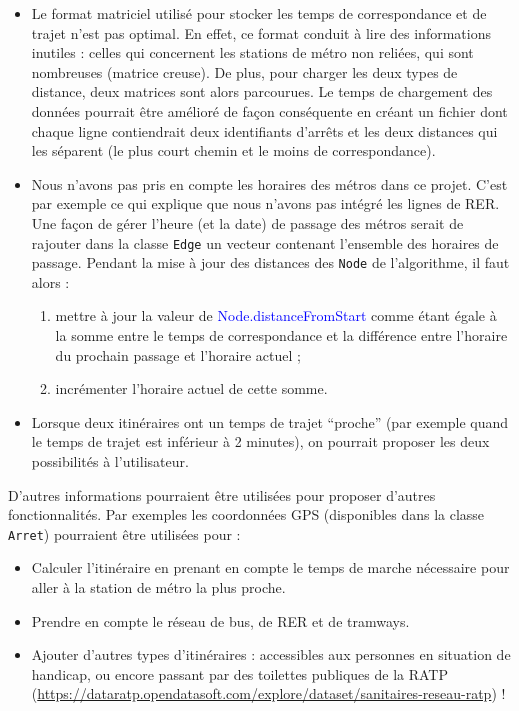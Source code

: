 \documentclass[,french]{article}
\begin{document}
\begin{itemize}
\item
  Le format matriciel utilisé pour stocker les temps de correspondance
  et de trajet n'est pas optimal. En effet, ce format conduit à lire des
  informations inutiles : celles qui concernent les stations de métro
  non reliées, qui sont nombreuses (matrice creuse). De plus, pour
  charger les deux types de distance, deux matrices sont alors
  parcourues. Le temps de chargement des données pourrait être amélioré
  de façon conséquente en créant un fichier dont chaque ligne
  contiendrait deux identifiants d'arrêts et les deux distances qui les
  séparent (le plus court chemin et le moins de correspondance).
\item
  Nous n'avons pas pris en compte les horaires des métros dans ce
  projet. C'est par exemple ce qui explique que nous n'avons pas intégré
  les lignes de RER. Une façon de gérer l'heure (et la date) de passage
  des métros serait de rajouter dans la classe \texttt{Edge} un vecteur
  contenant l'ensemble des horaires de passage. Pendant la mise à jour
  des distances des \texttt{Node} de l'algorithme, il faut alors :

  \begin{enumerate}
  \def\labelenumi{\arabic{enumi}.}
  \item
    mettre à jour la valeur de \textcolor{blue}{Node.distanceFromStart}
    comme étant égale à la somme entre le temps de correspondance et la
    différence entre l'horaire du prochain passage et l'horaire actuel ;
  \item
    incrémenter l'horaire actuel de cette somme.
  \end{enumerate}
\item
  Lorsque deux itinéraires ont un temps de trajet ``proche'' (par
  exemple quand le temps de trajet est inférieur à 2 minutes), on
  pourrait proposer les deux possibilités à l'utilisateur.
\end{itemize}

D'autres informations pourraient être utilisées pour proposer d'autres
fonctionnalités. Par exemples les coordonnées GPS (disponibles dans la
classe \texttt{Arret}) pourraient être utilisées pour :

\begin{itemize}
\item
  Calculer l'itinéraire en prenant en compte le temps de marche
  nécessaire pour aller à la station de métro la plus proche.
\item
  Prendre en compte le réseau de bus, de RER et de tramways.
\item
  Ajouter d'autres types d'itinéraires : accessibles aux personnes en
  situation de handicap, ou encore passant par des toilettes publiques
  de la RATP
  (\url{https://dataratp.opendatasoft.com/explore/dataset/sanitaires-reseau-ratp})
  !
\end{itemize}
\end{document}
